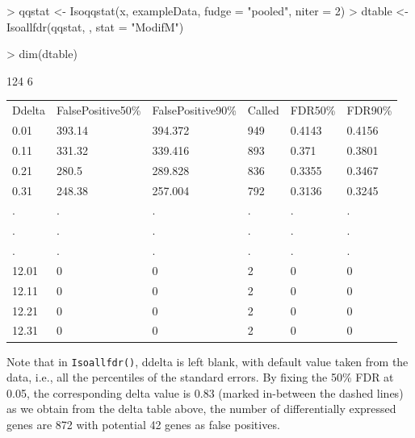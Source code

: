 \documentclass[10pt]{article}
\begin{document}
\begin{Schunk}
\begin{Sinput}
> qqstat <- Isoqqstat(x, exampleData, fudge = "pooled", niter = 2)
> dtable <- Isoallfdr(qqstat, , stat = "ModifM")
\end{Sinput}
\end{Schunk}

\begin{Schunk}
\begin{Sinput}
> dim(dtable)
\end{Sinput}
\begin{Soutput}
[1] 124   6
\end{Soutput}
\end{Schunk}
\begin{table}[!h]
\begin{left}
\begin{tabular}{llllll}
 Ddelta & FalsePositive50\% & FalsePositive90\% & Called & FDR50\% & FDR90\% \\ 
 0.01 & 393.14 & 394.372 & 949 & 0.4143 & 0.4156 \\ 
  0.11 & 331.32 & 339.416 & 893 & 0.371 & 0.3801 \\ 
  0.21 & 280.5 & 289.828 & 836 & 0.3355 & 0.3467 \\ 
  0.31 & 248.38 & 257.004 & 792 & 0.3136 & 0.3245 \\ 
  . & . & . & . & . & . \\ 
  . & . & . & . & . & . \\ 
  . & . & . & . & . & . \\ 
  12.01 & 0 & 0 & 2 & 0 & 0 \\ 
  12.11 & 0 & 0 & 2 & 0 & 0 \\ 
  12.21 & 0 & 0 & 2 & 0 & 0 \\ 
  12.31 & 0 & 0 & 2 & 0 & 0 \\ 
  \end{tabular}
\end{left}
\end{table}

Note that in \texttt{Isoallfdr()}, ddelta is left blank, with default value taken
from the data, i.e., all the percentiles of the standard errors.
By fixing the 50\% FDR at 0.05, the corresponding delta value is 0.83
(marked in-between the dashed lines) as we obtain from the delta table above,
the number of differentially expressed genes are 872 with potential 42 genes as false positives.
\end{document}
